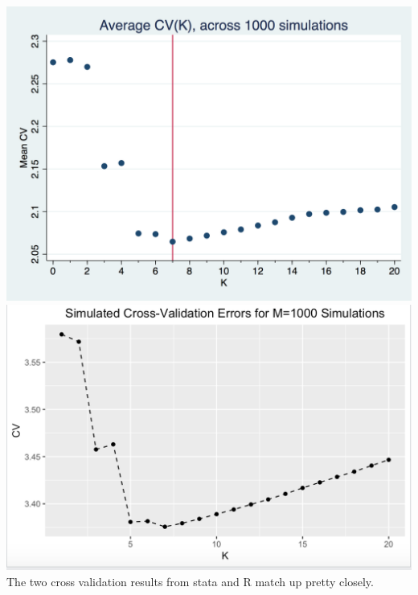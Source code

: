 \documentclass[12pt]{article}
\begin{document}
\subsubsection{}
\includegraphics[totalheight=4cm]{pset2q2b.png}
\includegraphics[totalheight=4cm]{pset2q2c_r.png}\\
The two cross validation results from stata and R match up pretty closely.
\end{document}
